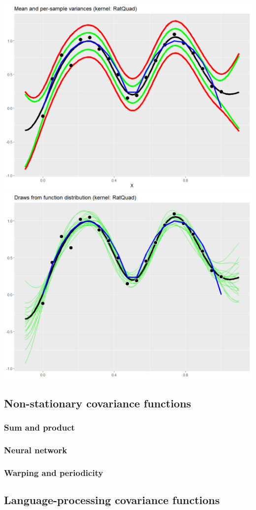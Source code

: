 \documentclass[10pt]{article}
\begin{document}
\includegraphics[height=0.5\textwidth]{ratquad_variances.png} \\
\includegraphics[height=0.5\textwidth]{ratquad_draws.png} \\


\subsection{Non-stationary covariance functions \cite{gp-ml}}

\subsubsection{Sum and product}

\subsubsection{Neural network}

\subsubsection{Warping and periodicity}


\subsection{Language-processing covariance functions \cite{gp-ml}}
\end{document}
